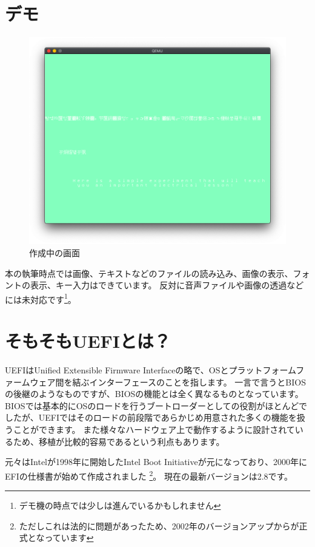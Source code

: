\documentclass[10pt, b5paper, openany]{ltjsbook}
\begin{document}
\chapter{デモ}
\begin{figure}[H]
    \centering
    \includegraphics[scale=0.3]{pic/screenshot.png}
    \caption{作成中の画面}
    \label{fig:screenshot}
\end{figure}
本の執筆時点では画像、テキストなどのファイルの読み込み、画像の表示、フォントの表示、キー入力はできています。
反対に音声ファイルや画像の透過などには未対応です\footnote{デモ機の時点では少しは進んでいるかもしれません}。

\chapter{そもそもUEFIとは？}
UEFIはUnified Extensible Firmware Interfaceの略で、OSとプラットフォームファームウェア間を結ぶインターフェースのことを指します。
一言で言うとBIOSの後継のようなものですが、BIOSの機能とは全く異なるものとなっています。
BIOSでは基本的にOSのロードを行うブートローダーとしての役割がほとんどでしたが、UEFIではそのロードの前段階であらかじめ用意された多くの機能を扱うことができます。
また様々なハードウェア上で動作するように設計されているため、移植が比較的容易であるという利点もあります。

元々はIntelが1998年に開始したIntel Boot Initiativeが元になっており、2000年にEFIの仕様書が始めて作成されました
\footnote{ただしこれは法的に問題があったため、2002年のバージョンアップからが正式となっています}。
現在の最新バージョンは2.8です。
\end{document}

